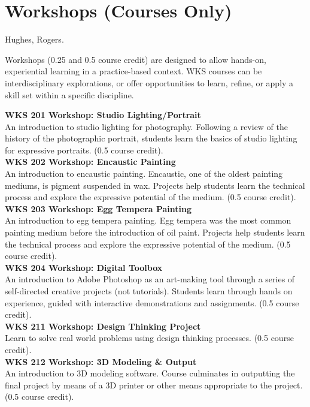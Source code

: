 \documentclass[
  letterpaper,
]{scrbook}
\begin{document}
\section{Workshops (Courses Only)}\label{workshops-courses-only}

Hughes, Rogers.

Workshops (0.25 and 0.5 course credit) are designed to allow hands-on,
experiential learning in a practice-based context. WKS courses can be
interdisciplinary explorations, or offer opportunities to learn, refine,
or apply a skill set within a specific discipline.

\textbf{WKS 201 Workshop: Studio Lighting/Portrait}\\
An introduction to studio lighting for photography. Following a review
of the history of the photographic portrait, students learn the basics
of studio lighting for expressive portraits. (0.5 course credit).\\
\textbf{WKS 202 Workshop: Encaustic Painting}\\
An introduction to encaustic painting. Encaustic, one of the oldest
painting mediums, is pigment suspended in wax. Projects help students
learn the technical process and explore the expressive potential of the
medium. (0.5 course credit).\\
\textbf{WKS 203 Workshop: Egg Tempera Painting}\\
An introduction to egg tempera painting. Egg tempera was the most common
painting medium before the introduction of oil paint. Projects help
students learn the technical process and explore the expressive
potential of the medium. (0.5 course credit).\\
\textbf{WKS 204 Workshop: Digital Toolbox}\\
An introduction to Adobe Photoshop as an art-making tool through a
series of self-directed creative projects (not tutorials). Students
learn through hands on experience, guided with interactive
demonstrations and assignments. (0.5 course credit).\\
\textbf{WKS 211 Workshop: Design Thinking Project}\\
Learn to solve real world problems using design thinking processes. (0.5
course credit).\\
\textbf{WKS 212 Workshop: 3D Modeling \& Output}\\
An introduction to 3D modeling software. Course culminates in outputting
the final project by means of a 3D printer or other means appropriate to
the project. (0.5 course credit).\\
\end{document}
